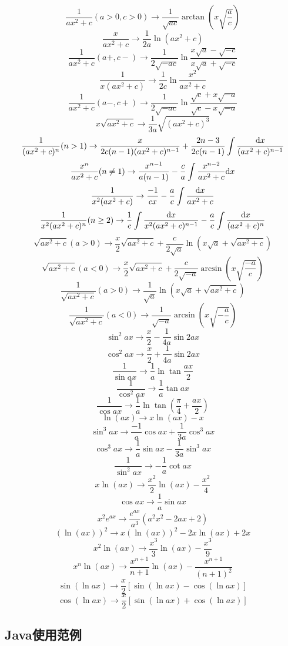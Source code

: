 \documentclass{article}
\begin{document}
\[\frac{1}{ax^2+c}(a>0,c>0) \to \frac{1}{\sqrt{ac}}\arctan{(x\sqrt{\frac{a}{c}})}\]
\[\frac{x}{ax^2+c} \to \frac{1}{2a}\ln(ax^2+c)\]
\[\frac{1}{ax^2+c}(a+,c-) \to \frac{1}{2\sqrt{-ac}}\ln\frac{x\sqrt{a}-\sqrt{-c}}{x\sqrt{a}+\sqrt{-c}}\]
\[\frac{1}{x(ax^2+c)} \to \frac{1}{2c}\ln\frac{x^2}{ax^2+c}\]
\[\frac{1}{ax^2+c}(a-,c+) \to \frac{1}{2\sqrt{-ac}}\ln\frac{\sqrt{c}+x\sqrt{-a}}{\sqrt{c}-x\sqrt{-a}}\]
\[x{\sqrt{ax^2+c}} \to \frac{1}{3a}\sqrt{(ax^2+c)^3}\]
\[\frac{1}{(ax^2+c)^n}(n>1) \to \frac{x}{2c(n-1)(ax^2+c)^{n-1}}+\frac{2n-3}{2c(n-1)}\int\frac{\mathrm{d} x}{(ax^2+c)^{n-1}}\]
\[\frac{x^n}{ax^2+c}(n\ne 1)\to \frac{x^{n-1}}{a(n-1)}-\frac{c}{a}\int\frac{x^{n-2}}{ax^2+c}\mathrm{d} x\]
\[\frac{1}{x^2(ax^2+c)} \to \frac{-1}{cx}-\frac{a}{c}\int\frac{\mathrm{d} x}{ax^2+c}\]
\[\frac{1}{x^2(ax^2+c)^n}(n\ge 2) \to \frac{1}{c}\int\frac{\mathrm{d} x}{x^2(ax^2+c)^{n-1}}-\frac{a}{c}\int\frac{\mathrm{d} x}{(ax^2+c)^n}\]
\[\sqrt{ax^2+c}(a>0) \to \frac{x}{2}\sqrt{ax^2+c}+\frac{c}{2\sqrt{a}}\ln(x\sqrt{a}+\sqrt{ax^2+c})\]
\[\sqrt{ax^2+c}(a<0) \to \frac{x}{2}\sqrt{ax^2+c}+\frac{c}{2\sqrt{-a}}\arcsin(x\sqrt{\frac{-a}{c}})\]
\[\frac{1}{\sqrt{ax^2+c}}(a>0) \to \frac{1}{\sqrt{a}}\ln(x\sqrt{a}+\sqrt{ax^2+c})\]
\[\frac{1}{\sqrt{ax^2+c}}(a<0) \to \frac{1}{\sqrt{-a}}\arcsin(x\sqrt{-\frac{a}{c}})\]
\[\sin^2 ax \to \frac{x}{2}-\frac{1}{4a}\sin 2ax\]
\[\cos^2 ax \to \frac{x}{2}+\frac{1}{4a}\sin 2ax\]
\[\frac{1}{\sin ax} \to \frac{1}{a}\ln\tan\frac{ax}{2}\]
\[\frac{1}{\cos^2 ax} \to \frac{1}{a}\tan ax\]
\[\frac{1}{\cos ax} \to \frac{1}{a}\ln \tan(\frac{\pi}{4}+\frac{ax}{2})\]
\[\ln(ax)\to x\ln(ax)-x\]
\[\sin^3 ax \to \frac{-1}{a}\cos ax+\frac{1}{3a}\cos^3 ax\]
\[\cos^3 ax \to \frac{1}{a}\sin ax - \frac{1}{3a}\sin^3 ax\]
\[\frac{1}{\sin^2 ax}\to -\frac{1}{a}\cot ax\]
\[x\ln(ax)\to \frac{x^2}{2}\ln(ax)-\frac{x^2}{4}\]
\[\cos ax\to \frac{1}{a}\sin ax\]
\[x^2 e^{ax} \to \frac{e^{ax}}{a^3}(a^2x^2-2ax+2)\]
\[(\ln(ax))^2 \to x(\ln(ax))^2-2x\ln(ax)+2x\]
\[x^2\ln(ax) \to \frac{x^3}{3}\ln(ax)-\frac{x^3}{9}\]
\[x^n\ln(ax) \to \frac{x^{n+1}}{n+1}\ln(ax)-\frac{x^{n+1}}{(n+1)^2}\]
\[\sin(\ln ax) \to \frac{x}{2}[\sin(\ln ax) - \cos(\ln ax)]\]
\[\cos(\ln ax) \to \frac{x}{2}[\sin(\ln ax) + \cos(\ln ax)]\]

\subsection{Java使用范例}
\end{document}

